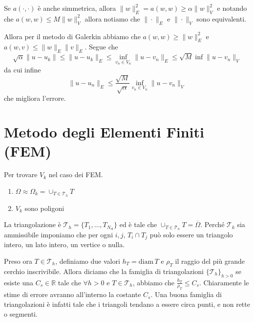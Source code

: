 Se \(a{(\cdot , \cdot )}\) è anche simmetrica, allora \(\|w\|^2_E = a{(w, w)}
\ge \alpha \|w\|^2_V\) e notando che \(a{(w, w)} \le M \|w\|^2_V\) allora
notiamo che \(\|\cdot \|_E\) e \(\|\cdot \|_V\) sono equivalenti.

Allora per il metodo di Galerkin abbiamo che \(a{(w, w)} \ge \|w\|^2_E\) e
\(a{(w, v)} \le \|w\|_E \|v\|_E\). Segue che
\[
  \sqrt{\alpha} \|u - u_k\| \le  \|u - u_k\|_E \le \inf_{v_n \in V_n}
  \|u - v_n\|_E \le \sqrt{M} \inf \|u - v_n\|_V 
\]
da cui infine 
\[
  \|u - u_n\|_E \le \frac{\sqrt{M}}{\sqrt{\alpha}} \inf_{v_{n} \in V_n} \|u -
  v_n\|_V
\]
che migliora l'errore.

\section{Metodo degli Elementi Finiti (FEM)}

Per trovare \(V_k\) nel caso dei FEM. 

\begin{enumerate}[label = \arabic*.]
    \item \(\Omega \approx \Omega_k = \cup_{T \in  \mathcal{T}_h} T\) 
    \item \(V_k\) sono poligoni 
\end{enumerate}

La triangolazione è \(\mathcal{T}_h = \{T_{1}, \dots, T_{N_\text{el}} \} \) ed è
tale che \(\cup_{T \in \mathcal{T}_n} T = \overline{\Omega}\). Perché
\(\mathcal{T}_k\) sia ammissibile imponiamo che per ogni \(i, j\), \(T_{i}
\cap T_j\) può solo essere un triangolo intero, un lato intero, un vertice o
nulla.

Preso ora \(T \in \mathcal{T}_h\), definiamo due valori \(h_T = \mathrm{diam}\,T\)
e \(\rho_T\) il raggio del più grande cerchio inscrivibile. Allora diciamo che
la famiglia di triangolazioni \(\{\mathcal{T}_h\}_{h > 0}  \) se esiste una
\(C_s \in \mathbb{R}\) tale che \(\forall h > 0\) e \(T \in \mathcal{T}_h\),
abbiamo che \(\frac{h_T}{\rho_T} \le C_s\). Chiaramente le stime di errore
avranno all'interno la costante \(C_s\). Una buona famiglia di triangolazioni è
infatti tale che i triangoli tendano a essere circa punti, e non rette o
segmenti.

